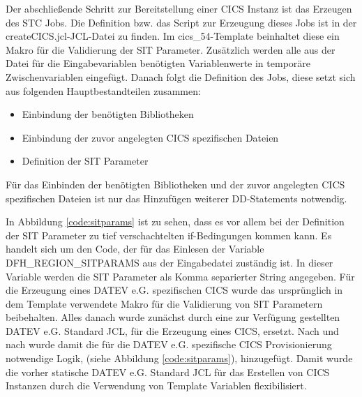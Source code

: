 \begin{minipage}{\linewidth}

\end{minipage}

Der abschließende Schritt zur Bereitstellung einer CICS Instanz ist das Erzeugen des STC Jobs.
Die Definition bzw. das Script zur Erzeugung dieses Jobs ist in der \glqq createCICS.jcl\grqq-JCL-Datei zu finden.
Im \glqq cics\_54\grqq-Template beinhaltet diese ein Makro für die Validierung der SIT Parameter.
Zusätzlich werden alle aus der Datei für die Eingabevariablen benötigten Variablenwerte in temporäre Zwischenvariablen eingefügt.
Danach folgt die Definition des Jobs, diese setzt sich aus folgenden Hauptbestandteilen zusammen:

\begin{itemize}
\item Einbindung der benötigten Bibliotheken
\item Einbindung der zuvor angelegten CICS spezifischen Dateien
\item Definition der SIT Parameter
\end{itemize}

Für das Einbinden der benötigten Bibliotheken und der zuvor angelegten CICS spezifischen Dateien ist nur das Hinzufügen weiterer DD-Statements notwendig.

In Abbildung \ref{code:sitparams} ist zu sehen, dass es vor allem bei der Definition der SIT Parameter zu tief verschachtelten if-Bedingungen kommen kann.
Es handelt sich um den Code, der für das Einlesen der Variable  \glqq DFH\_REGION\_SITPARAMS\grqq{} aus der Eingabedatei zuständig ist.
In dieser Variable werden die SIT Parameter als Komma separierter String angegeben.
Für die Erzeugung eines DATEV e.G. spezifischen CICS wurde das ursprünglich in dem Template verwendete Makro für die Validierung von SIT Parametern beibehalten.
Alles danach wurde zunächst durch eine zur Verfügung gestellten DATEV e.G. Standard JCL, für die Erzeugung eines CICS, ersetzt.
Nach und nach wurde damit die für die DATEV e.G. spezifische CICS Provisionierung notwendige Logik, (siehe Abbildung \ref{code:sitparams}), hinzugefügt.
Damit wurde die vorher statische DATEV e.G. Standard JCL für das Erstellen von CICS Instanzen durch die Verwendung von Template  Variablen flexibilisiert.

\begin{minipage}{\linewidth}

\end{minipage}


